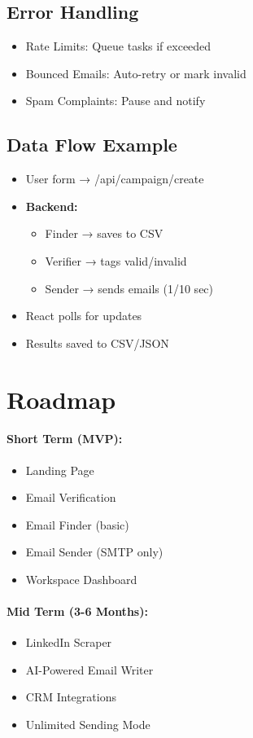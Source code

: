 \documentclass{article}
\begin{document}
\subsection{Error Handling}
\begin{itemize}
    \item Rate Limits: Queue tasks if exceeded
    \item Bounced Emails: Auto-retry or mark invalid
    \item Spam Complaints: Pause and notify
\end{itemize}

\subsection{Data Flow Example}
\begin{itemize}
    \item User form → /api/campaign/create
    \item \textbf{Backend:}
    \begin{itemize}
        \item Finder → saves to CSV
        \item Verifier → tags valid/invalid
        \item Sender → sends emails (1/10 sec)
    \end{itemize}
    \item React polls for updates
    \item Results saved to CSV/JSON
\end{itemize}

\section{Roadmap}
\paragraph{Short Term (MVP):}
\begin{itemize}
    \item Landing Page
    \item Email Verification
    \item Email Finder (basic)
    \item Email Sender (SMTP only)
    \item Workspace Dashboard
\end{itemize}

\paragraph{Mid Term (3-6 Months):}
\begin{itemize}
    \item LinkedIn Scraper
    \item AI-Powered Email Writer
    \item CRM Integrations
    \item Unlimited Sending Mode
\end{itemize}
\end{document}
